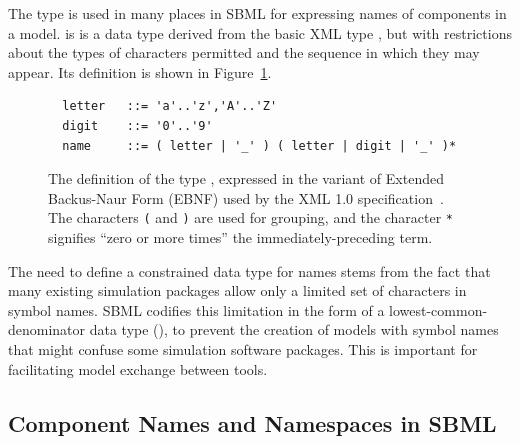 \documentclass[10pt]{cekarticle}
\newcommand{\vref}[1]{\ref{#1}}
\newcommand{\changed}[1]{\textcolor{BrickRed}{#1}}
\newenvironment{blockChanged}{\color{BrickRed}}{}
\begin{document}
The type  is used in many places in SBML for expressing names
of components in a model.   is is a data type derived from the
basic XML type , but with restrictions about the types of
characters permitted and the sequence in which they may appear.  Its 
definition is shown in Figure~\vref{fig:name}.

\begin{figure}[t]
  \vspace*{10pt}
  \centering
  \begin{blockChanged}
  \begin{minipage}{4.2in}
\begin{verbatim}
  letter   ::= 'a'..'z','A'..'Z'
  digit    ::= '0'..'9'
  name     ::= ( letter | '_' ) ( letter | digit | '_' )*
\end{verbatim}
  \end{minipage}
\end{blockChanged}
\caption{\changed{The definition of the type , expressed in the
    variant of Extended Backus-Naur Form (EBNF) used by the XML 1.0
    specification~\protect\citep{bray:2000}.  The characters \texttt{(} and
    \texttt{)} are used for grouping, and the character \texttt{*}
    signifies ``zero or more times'' the immediately-preceding term.}}
  \label{fig:name}
\end{figure}    

The need to define a constrained data type for names stems from the fact
that many existing simulation packages allow only a limited set of
characters in symbol names.  SBML codifies this limitation in the form of a
lowest-common-denominator data type (), to prevent the
creation of models with symbol names that might confuse some simulation
software packages.  This is important for facilitating model exchange
between tools.


\subsection{Component Names and Namespaces in SBML}
\label{sec:namespaces}
\end{document}
